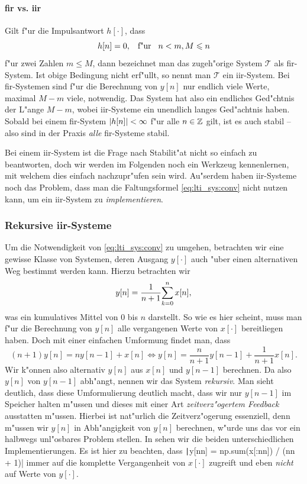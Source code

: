 \paragraph{\texorpdfstring{\acrshort{fir}}{FIR} vs. \texorpdfstring{\acrshort{iir}}{IIR}}
%
Gilt f"ur die Impulsantwort $h[\cdot]$, dass
\[
h[n] = 0, {\hspace{3mm} \text{f"ur} \hspace{3mm}} n < m, M \leqslant n
\]
f"ur zwei Zahlen $m \leqslant M$, dann bezeichnet man das zugeh"orige System $\mathcal{T}$ als \gls{fir}-System.
Ist obige Bedingung nicht erf"ullt, so nennt man $\mathcal{T}$ ein \gls{iir}-System.
Bei \gls{fir}-Systemen sind f"ur die Berechnung von $y[n]$ nur endlich viele Werte, maximal $M - m$ viele, notwendig.
Das System hat also ein endliches Ged"chtnis der L"ange $M - m$, wobei \gls{iir}-Systeme ein unendlich langes Ged"achtnis haben.
Sobald bei einem \gls{fir}-System ${\left| h[n] \right|} < \infty$ f"ur alle $n \in \mathbb{Z}$ gilt, ist es auch stabil -- also sind in der Praxis \emph{alle} \gls{fir}-Systeme stabil.

Bei einem \gls{iir}-System ist die Frage nach Stabilit"at nicht so einfach zu beantworten, doch wir werden im Folgenden noch ein Werkzeug kennenlernen, mit welchem dies einfach nachzupr"ufen sein wird.
Au"serdem haben \gls{iir}-Systeme noch das Problem, dass man die Faltungsformel \eqref{eq:lti_sys:conv} nicht nutzen kann, um ein \gls{iir}-System zu \emph{implementieren}.
%
%
\subsubsection{Rekursive \texorpdfstring{\acrshort{iir}}{IIR}-Systeme}
%
%
Um die Notwendigkeit von \eqref{eq:lti_sys:conv} zu umgehen, betrachten wir eine gewisse Klasse von Systemen, deren Ausgang $y[\cdot]$ auch "uber einen alternativen Weg bestimmt werden kann.
Hierzu betrachten wir
\[
y[n] = \frac{1}{n+1}{\sum\limits_{k=0}^{n}{x[n]}},
\]
was ein kumulatives Mittel von $0$ bis $n$ darstellt.
So wie es hier scheint, muss man f"ur die Berechnung von $y[n]$ alle vergangenen Werte von $x[\cdot]$ bereitliegen haben.
Doch mit einer einfachen Umformung findet man, dass
\[
(n+1)y[n] = n y[n-1] + x[n] 
\Leftrightarrow 
y[n] = \frac{n}{n+1} y[n-1] + \frac{1}{n+1} x[n].
\]
Wir k"onnen also alternativ $y[n]$ aus $x[n]$ und $y[n-1]$ berechnen.
Da also $y[n]$ von $y[n-1]$ abh"angt, nennen wir das System \emph{rekursiv}.
Man sieht deutlich, dass diese Umformulierung deutlich macht, dass wir nur $y[n-1]$ im Speicher halten m"ussen und dieses mit einer Art \emph{zeitverz"ogertem Feedback} ausstatten m"ussen.
Hierbei ist nat"urlich die Zeitverz"ogerung essenziell, denn m"ussen wir $y[n]$ in Abh"angigkeit von $y[n]$ berechnen, w"urde uns das vor ein halbwegs unl"osbares Problem stellen.
In  sehen wir die beiden unterschiedlichen Implementierungen.
Es ist hier zu beachten, dass \texttt|y[nn] = np.sum(x[:nn]) / (nn + 1)| immer auf die komplette Vergangenheit von $x[\cdot]$ zugreift und eben \emph{nicht} auf Werte von $y[\cdot]$.

